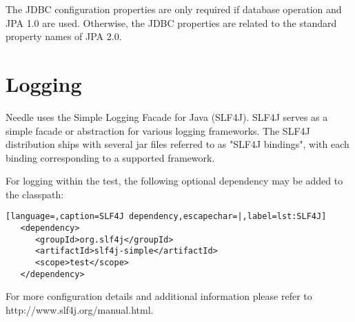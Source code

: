 The JDBC configuration properties are only required if database operation and JPA 1.0 are used.
Otherwise, the JDBC properties are related to the standard property names of JPA 2.0.

\section{Logging}
Needle uses the Simple Logging Facade for Java (SLF4J). SLF4J serves as a simple facade or abstraction for various logging frameworks.
The SLF4J distribution ships with several jar files referred to as "SLF4J bindings", with each binding corresponding to a supported framework.


For logging within the test, the following optional dependency may be added to the classpath:


\begin{lstlisting}[language=,caption=SLF4J dependency,escapechar=|,label=lst:SLF4J]
   <dependency>
      <groupId>org.slf4j</groupId>
      <artifactId>slf4j-simple</artifactId>
      <scope>test</scope>
   </dependency>
\end{lstlisting}

For more configuration details and additional information please refer to \\
http://www.slf4j.org/manual.html.

